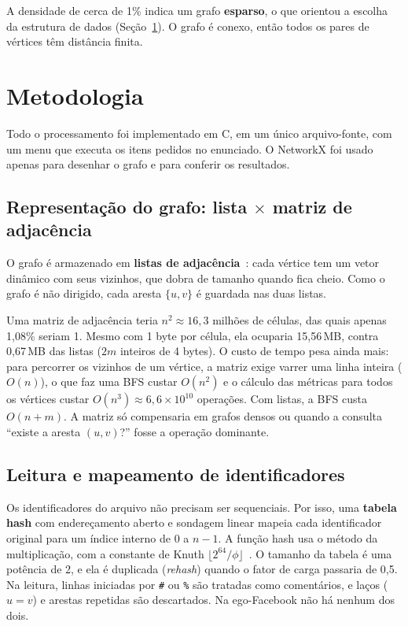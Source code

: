 \documentclass[conference]{IEEEtran}
\begin{document}
A densidade de cerca de 1\% indica um grafo \textbf{esparso}, o que orientou a escolha da estrutura de dados (Seção~\ref{sec:metodo}). O grafo é conexo, então todos os pares de vértices têm distância finita.

\section{Metodologia}\label{sec:metodo}

Todo o processamento foi implementado em C, em um único arquivo-fonte, com um menu que executa os itens pedidos no enunciado. O NetworkX foi usado apenas para desenhar o grafo e para conferir os resultados.

\subsection{Representação do grafo: lista $\times$ matriz de adjacência}

O grafo é armazenado em \textbf{listas de adjacência}~\cite{ziviani2011,cormen2012}: cada vértice tem um vetor dinâmico com seus vizinhos, que dobra de tamanho quando fica cheio. Como o grafo é não dirigido, cada aresta $\{u,v\}$ é guardada nas duas listas.

Uma matriz de adjacência teria $n^2 \approx 16{,}3$ milhões de células, das quais apenas 1,08\% seriam 1. Mesmo com 1 byte por célula, ela ocuparia 15,56\,MB, contra 0,67\,MB das listas ($2m$ inteiros de 4 bytes). O custo de tempo pesa ainda mais: para percorrer os vizinhos de um vértice, a matriz exige varrer uma linha inteira ($O(n)$), o que faz uma BFS custar $O(n^2)$ e o cálculo das métricas para todos os vértices custar $O(n^3) \approx 6{,}6\times10^{10}$ operações. Com listas, a BFS custa $O(n+m)$. A matriz só compensaria em grafos densos ou quando a consulta ``existe a aresta $(u,v)$?'' fosse a operação dominante.

\subsection{Leitura e mapeamento de identificadores}

Os identificadores do arquivo não precisam ser sequenciais. Por isso, uma \textbf{tabela hash} com endereçamento aberto e sondagem linear mapeia cada identificador original para um índice interno de 0 a $n-1$. A função hash usa o método da multiplicação, com a constante de Knuth $\lfloor 2^{64}/\phi \rfloor$~\cite{knuth1998,cormen2012}. O tamanho da tabela é uma potência de 2, e ela é duplicada (\textit{rehash}) quando o fator de carga passaria de 0,5. Na leitura, linhas iniciadas por \texttt{\#} ou \texttt{\%} são tratadas como comentários, e laços ($u=v$) e arestas repetidas são descartados. Na ego-Facebook não há nenhum dos dois.
\end{document}
